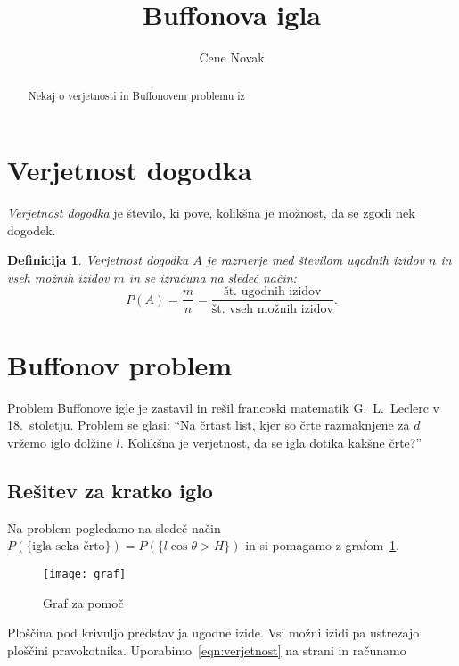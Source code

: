 \documentclass{article}
\title{Buffonova igla}
\author{Cene Novak}
\newtheorem{definicija}{Definicija}
\begin{document}
\maketitle

\begin{abstract}
    Nekaj o verjetnosti in Buffonovem problemu iz~\cite{book}
\end{abstract}

\section{Verjetnost dogodka}

\emph{Verjetnost dogodka} je število, ki pove, kolikšna je možnost, da se zgodi nek dogodek.

\begin{definicija}
Verjetnost dogodka $A$ je razmerje med številom ugodnih izidov $n$
in vseh možnih izidov $m$ in se izračuna na sledeč način:
\begin{equation}
\label{eqn:verjetnost}
P(A) = \frac{m}{n} = \frac{\text{št. ugodnih izidov}}{\text{št. vseh možnih izidov}}.
\end{equation}
\end{definicija}


\section{Buffonov problem}
Problem Buffonove igle je zastavil in rešil francoski 
matematik G.~L.~Leclerc v 18.~stoletju. Problem se glasi:
``Na črtast list, kjer so črte razmaknjene za $d$
vržemo iglo dolžine $l$. Kolikšna je verjetnost, da se igla dotika kakšne črte?''


\subsection{Rešitev za kratko iglo}
Na problem pogledamo na sledeč način $P(\{\text{igla seka črto}\}) = P(\{ l\cos{\theta} > H\})$ 
in si pomagamo z grafom~\ref{fig:graf}.

\begin{figure}[!h]
\centering
\caption{Graf za pomoč}
\label{fig:graf}
\texttt{[image: graf]}
\end{figure}

Ploščina pod krivuljo predstavlja ugodne izide. Vsi možni izidi pa 
ustrezajo ploščini pravokotnika. Uporabimo~\eqref{eqn:verjetnost} 
na strani \pageref{eqn:verjetnost} in računamo
\end{document}
